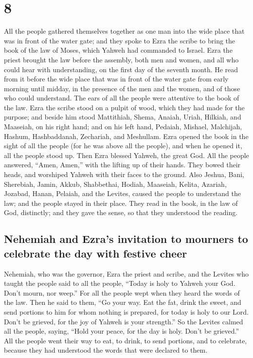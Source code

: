 \hypertarget{section-7}{%
\section{8}\label{section-7}}

 All the people gathered themselves together as one man
into the wide place that was in front of the water gate; and they spoke
to Ezra the scribe to bring the book of the law of Moses, which Yahweh
had commanded to Israel.  Ezra the priest brought the law
before the assembly, both men and women, and all who could hear with
understanding, on the first day of the seventh month.  He
read from it before the wide place that was in front of the water gate
from early morning until midday, in the presence of the men and the
women, and of those who could understand. The ears of all the people
were attentive to the book of the law.  Ezra the scribe
stood on a pulpit of wood, which they had made for the purpose; and
beside him stood Mattithiah, Shema, Anaiah, Uriah, Hilkiah, and
Maaseiah, on his right hand; and on his left hand, Pedaiah, Mishael,
Malchijah, Hashum, Hashbaddanah, Zechariah, and Meshullam.
 Ezra opened the book in the sight of all the people (for
he was above all the people), and when he opened it, all the people
stood up.  Then Ezra blessed Yahweh, the great God. All
the people answered, ``Amen, Amen,'' with the lifting up of their hands.
They bowed their heads, and worshiped Yahweh with their faces to the
ground.  Also Jeshua, Bani, Sherebiah, Jamin, Akkub,
Shabbethai, Hodiah, Maaseiah, Kelita, Azariah, Jozabad, Hanan, Pelaiah,
and the Levites, caused the people to understand the law; and the people
stayed in their place.  They read in the book, in the law
of God, distinctly; and they gave the sense, so that they understood the
reading.

\hypertarget{nehemiah-and-ezras-invitation-to-mourners-to-celebrate-the-day-with-festive-cheer}{%
\subsection{Nehemiah and Ezra's invitation to mourners to celebrate the
day with festive
cheer}\label{nehemiah-and-ezras-invitation-to-mourners-to-celebrate-the-day-with-festive-cheer}}

 Nehemiah, who was the governor, Ezra the priest and
scribe, and the Levites who taught the people said to all the people,
``Today is holy to Yahweh your God. Don't mourn, nor weep.'' For all the
people wept when they heard the words of the law.  Then
he said to them, ``Go your way. Eat the fat, drink the sweet, and send
portions to him for whom nothing is prepared, for today is holy to our
Lord. Don't be grieved, for the joy of Yahweh is your strength.''
 So the Levites calmed all the people, saying, ``Hold
your peace, for the day is holy. Don't be grieved.''  All
the people went their way to eat, to drink, to send portions, and to
celebrate, because they had understood the words that were declared to
them.

